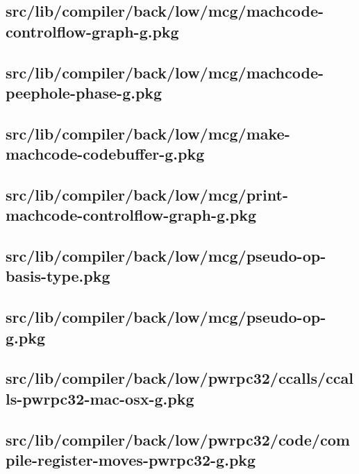 \subsection{src/lib/compiler/back/low/mcg/machcode-controlflow-graph-g.pkg}


\subsection{src/lib/compiler/back/low/mcg/machcode-peephole-phase-g.pkg}


\subsection{src/lib/compiler/back/low/mcg/make-machcode-codebuffer-g.pkg}


\subsection{src/lib/compiler/back/low/mcg/print-machcode-controlflow-graph-g.pkg}


\subsection{src/lib/compiler/back/low/mcg/pseudo-op-basis-type.pkg}


\subsection{src/lib/compiler/back/low/mcg/pseudo-op-g.pkg}


\subsection{src/lib/compiler/back/low/pwrpc32/ccalls/ccalls-pwrpc32-mac-osx-g.pkg}


\subsection{src/lib/compiler/back/low/pwrpc32/code/compile-register-moves-pwrpc32-g.pkg}


